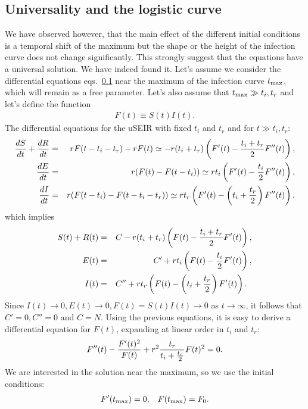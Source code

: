 \documentclass[a4paper,oneside,11pt]{article}
\begin{document}
  \subsection{Universality and the logistic curve}

   We have observed however, that the main effect of the different initial conditions is a temporal shift of the maximum but the shape or the height of the infection curve does not change significantly. This strongly suggest that the equations have a universal solution. We have indeed found it. Let's assume we consider the differential equations eqs.~\ref{} near the maximum of the infection curve $t_{\rm max}$, which will remain as a free parameter. Let's also assume that $t_{\rm max} \gg t_i, t_r$ and let's define the function
 \begin{eqnarray}
 F(t) \equiv S(t) I(t).
 \end{eqnarray}
 The differential equations for the uSEIR with fixed $t_i$ and $t_r$ and for $t\gg t_i, t_r$:
 \begin{eqnarray}
 {d S \over dt}+{d R\over dt} &=& r F(t-t_i - t_r) - r F(t) \simeq -r (t_i+t_r) \left(F'(t)-{t_i+t_r\over 2} F''(t)\right), \nonumber\\
  {d E \over dt} &=& r (F(t) - F(t-t_i))  \simeq r t_i \left(F'(t)-{t_i\over 2} F''(t)\right) , \nonumber\\
   {d I \over dt} &=& r (F(t-t_i) - F(t-t_i-t_r))  \simeq r t_r \left(F'(t) - \left(t_i+{t_r\over 2}\right) F''(t)\right).
 \end{eqnarray}
 which implies
 \begin{eqnarray}
 S(t)+R(t) &=& C - r (t_i + t_r) \left(F(t)-{t_i+t_r\over 2} F'(t)\right), \nonumber\\
   E(t) &=& C' +r t_i \left( F(t)-{t_i\over 2} F'(t)\right), \nonumber\\
   I(t) &=& C'' +r t_r \left(F(t)-\left(t_i+{t_r\over 2}\right) F'(t)\right). \;\;
 \end{eqnarray}
 Since $I(t) \rightarrow 0, E(t)\rightarrow 0, F(t) = S(t) I(t) \rightarrow 0$ as $t\rightarrow \infty$, it follows that $C'=0, C''=0$ and $C= N$.
 Using the previous equations, it is easy to derive a differential equation for $F(t)$, expanding at linear order in $t_i$ and $t_r$:
  \begin{eqnarray}
 F''(t) - {F'(t)^2\over F(t)} + r^2 {t_r\over t_i+{t_r\over 2}} F(t)^2 = 0.
 \end{eqnarray}
 We are interested in the solution near the maximum, so we use the initial conditions:
 \begin{eqnarray}
 F'(t_{\rm max}) = 0, \;\;\; F(t_{\rm max}) = F_0.
 \end{eqnarray}
\end{document}
